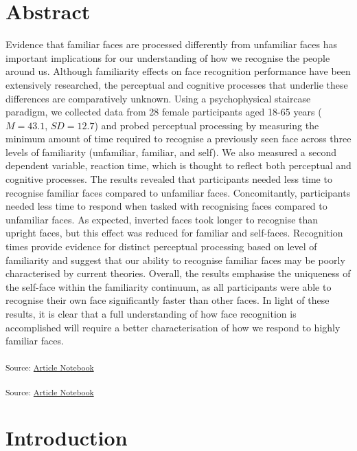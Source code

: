 \documentclass[
  10pt,
  letterpaper,
]{article}
\begin{document}
\section*{Abstract}
Evidence that familiar faces are processed differently from unfamiliar
faces has important implications for our understanding of how we
recognise the people around us. Although familiarity effects on face
recognition performance have been extensively researched, the perceptual
and cognitive processes that underlie these differences are
comparatively unknown. Using a psychophysical staircase paradigm, we
collected data from 28 female participants aged 18-65 years
(\(M = 43.1\), \(SD = 12.7\)) and probed perceptual processing by
measuring the minimum amount of time required to recognise a previously
seen face across three levels of familiarity (unfamiliar, familiar, and
self). We also measured a second dependent variable, reaction time,
which is thought to reflect both perceptual and cognitive processes. The
results revealed that participants needed less time to recognise
familiar faces compared to unfamiliar faces. Concomitantly, participants
needed less time to respond when tasked with recognising faces compared
to unfamiliar faces. As expected, inverted faces took longer to
recognise than upright faces, but this effect was reduced for familiar
and self-faces. Recognition times provide evidence for distinct
perceptual processing based on level of familiarity and suggest that our
ability to recognise familiar faces may be poorly characterised by
current theories. Overall, the results emphasise the uniqueness of the
self-face within the familiarity continuum, as all participants were
able to recognise their own face significantly faster than other faces.
In light of these results, it is clear that a full understanding of how
face recognition is accomplished will require a better characterisation
of how we respond to highly familiar faces.


\linenumbers
\textsubscript{Source:
\href{https://deborahapthorp.github.io/SelfFaceManuscript/index.qmd.html}{Article
Notebook}}

\textsubscript{Source:
\href{https://deborahapthorp.github.io/SelfFaceManuscript/index.qmd.html}{Article
Notebook}}

\section{Introduction}\label{introduction}
\end{document}
